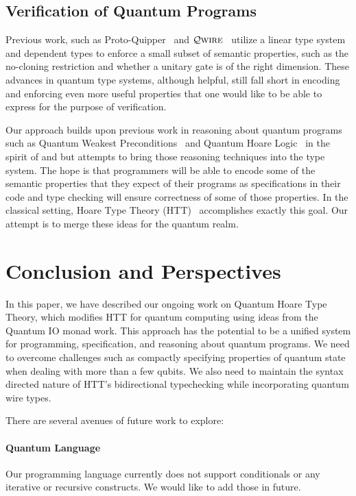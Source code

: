 \documentclass[acmsmall,nonacm,timestamp,review=false,anonymous=false]{acmart}
\newcommand{\qwire}{\ensuremath{\mathcal{Q}\textsc{wire}}\xspace}
\begin{document}
\subsection{Verification of Quantum Programs}
Previous work, such as Proto-Quipper~\cite{ross_algebraic_2015,rios_categorical_2017} and \qwire~\cite{paykin_qwire:_2017,rand_qwire_2017,rand_formally_2018} utilize a linear type system and dependent types to enforce a small subset of semantic properties, such as the no-cloning restriction and whether a unitary gate is of the right dimension. These advances in quantum type systems, although helpful, still fall short in encoding and enforcing even more useful properties that one would like to be able to express for the purpose of verification.

Our approach builds upon previous work in reasoning about quantum programs such as Quantum Weakest Preconditions~\cite{dhondt_quantum_2006} and Quantum Hoare Logic~\cite{ying_floydhoare_2012} in the spirit of \citet{hoare_axiomatic_1969} and \citet{dijkstra_discipline_1976} but attempts to bring those reasoning techniques into the type system. The hope is that programmers will be able to encode some of the semantic properties that they expect of their programs as specifications in their code and type checking will ensure correctness of some of those properties. In the classical setting, Hoare Type Theory (HTT)~\cite{nanevski_hoare_2008} accomplishes exactly this goal. Our attempt is to merge these ideas for the quantum realm.


\section{Conclusion and Perspectives}
\label{sec:conclusion}
In this paper, we have described our ongoing work on Quantum Hoare Type Theory, which modifies HTT for quantum computing using ideas from the Quantum IO monad work. This approach has the potential to be a unified system for programming, specification, and reasoning about quantum programs. We need to overcome challenges such as compactly specifying properties of quantum state when dealing with more than a few qubits. We also need to maintain the syntax directed nature of HTT's bidirectional typechecking while incorporating quantum wire types.

There are several avenues of future work to explore:

\paragraph{Quantum Language} Our programming language currently does not support conditionals or any iterative or recursive constructs. We would like to add those in future.
\end{document}
